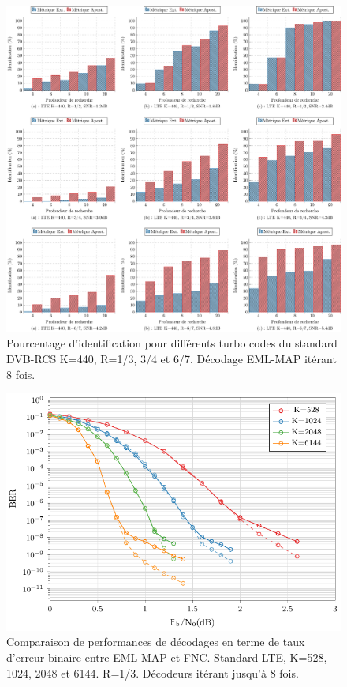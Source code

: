 \begin{figure}[!h]
	\centering
	\hspace*{-1cm}
	\includegraphics[width=1.05\textwidth]{main/ch3_fig/id2/dvb/tikz/440.pdf}
	\caption{Pourcentage d'identification pour différents turbo codes du standard DVB-RCS K=440, R=1/3, 3/4 et 6/7.
	Décodage EML-MAP itérant 8 fois. \label{fig:dvb440}}
\end{figure}

\begin{figure}[!t]
	\centering
	\includegraphics[width=\textwidth]{main/ch3_fig/fnc/lte/tikz/lte_ber.pdf}
	\caption{Comparaison de performances de décodages en terme de taux d'erreur binaire entre EML-MAP et FNC. Standard LTE, K=528, 1024, 2048 et 6144. R=1/3.
	Décodeurs itérant jusqu'à 8 fois. \label{fig:fnc_lte_ber}}
\end{figure}

